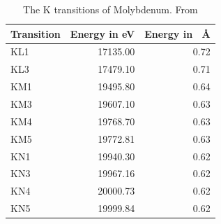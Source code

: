 \begin{table}[ht]
    \centering
    \begin{tabular}{lrr}
        \toprule
        Transition & Energy in eV & Energy in \SI{}{\angstrom} \\
        \midrule
        KL1 & 17135.00 & 0.72 \\
        KL3 & 17479.10 & 0.71 \\
        KM1 & 19495.80 & 0.64 \\
        KM3 & 19607.10 & 0.63 \\
        KM4 & 19768.70 & 0.63 \\
        KM5 & 19772.81 & 0.63 \\
        KN1 & 19940.30 & 0.62 \\
        KN3 & 19967.16 & 0.62 \\
        KN4 & 20000.73 & 0.62 \\
        KN5 & 19999.84 & 0.62 \\
        \bottomrule
    \end{tabular}
    \caption{The K transitions of Molybdenum. From \cite{XRayDatabase}}
\end{table}